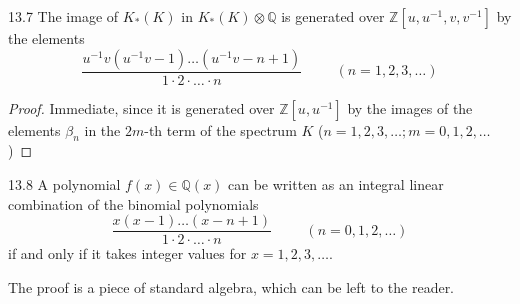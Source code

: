 \documentclass[../main]{subfiles}
\begin{document}
\begin{customlemma}{13.7}
\label{lem:p2c13.7}
The image of $K_\ast(K)$ in $K_\ast(K)\otimes \mathbb{Q}$ is generated over $\mathbb{Z}[u,u^{-1},v,v^{-1}]$ by the elements \[\dfrac{u^{-1}v(u^{-1}v-1)\dots(u^{-1}v-n+1)}{1\cdot 2\cdot\ldots \cdot n}\hspace{1cm} (n=1,2,3,\ldots)\]
\end{customlemma}
\begin{proof}
Immediate, since it is generated over $\mathbb{Z}[u,u^{-1}]$ by the images of the elements $\beta_n$ in the $2m$-th term of the spectrum $K$ ($n=1,2,3,\ldots; m=0,1,2,\ldots$)
\end{proof}
\begin{customlemma}{13.8}
\label{lem:p2c13.8}
A polynomial $f(x)\in\mathbb{Q}(x)$ can be written as an integral linear combination of the binomial polynomials \[\dfrac{x(x-1)\ldots(x-n+1)}{1\cdot 2 \cdot \ldots \cdot n}\hspace{1cm} (n=0,1,2,\dots)\]
if and only if it takes integer values for $x=1,2,3,\dots$.
\end{customlemma}
The proof is a piece of standard algebra, which can be left to the
reader.
\end{document}
